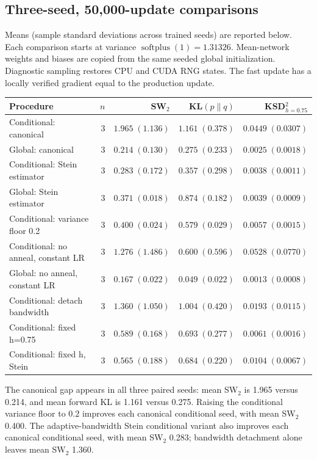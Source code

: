 \documentclass[11pt,a4paper]{article}
\numberwithin{equation}{section}
\begin{document}
\subsection{Three-seed, 50,000-update comparisons}
Means (sample standard deviations across trained seeds) are reported below.
Each comparison starts at variance $\operatorname{softplus}(1)=1.31326$.
Mean-network weights and biases are copied from the same seeded global
initialization. Diagnostic sampling restores CPU and CUDA RNG states. The
fast update has a locally verified gradient equal to the production update.
\begin{center}\small
\begin{tabular}{p{6.1cm}rrrr}\toprule
Procedure & $n$ & SW$_2$ & KL$(p\|q)$ & KSD$^2_{h=0.75}$\\\midrule
Conditional: canonical & 3 & $1.965\;(1.136)$ & $1.161\;(0.378)$ & $0.0449\;(0.0307)$ \\
Global: canonical & 3 & $0.214\;(0.130)$ & $0.275\;(0.233)$ & $0.0025\;(0.0018)$ \\
Conditional: Stein estimator & 3 & $0.283\;(0.172)$ & $0.357\;(0.298)$ & $0.0038\;(0.0011)$ \\
Global: Stein estimator & 3 & $0.371\;(0.018)$ & $0.874\;(0.182)$ & $0.0039\;(0.0009)$ \\
Conditional: variance floor 0.2 & 3 & $0.400\;(0.024)$ & $0.579\;(0.029)$ & $0.0057\;(0.0015)$ \\
Conditional: no anneal, constant LR & 3 & $1.276\;(1.486)$ & $0.600\;(0.596)$ & $0.0528\;(0.0770)$ \\
Global: no anneal, constant LR & 3 & $0.167\;(0.022)$ & $0.049\;(0.022)$ & $0.0013\;(0.0008)$ \\
Conditional: detach bandwidth & 3 & $1.360\;(1.050)$ & $1.004\;(0.420)$ & $0.0193\;(0.0115)$ \\
Conditional: fixed h=0.75 & 3 & $0.589\;(0.168)$ & $0.693\;(0.277)$ & $0.0061\;(0.0016)$ \\
Conditional: fixed h, Stein & 3 & $0.565\;(0.188)$ & $0.684\;(0.220)$ & $0.0104\;(0.0067)$ \\
\bottomrule\end{tabular}
\end{center}
The canonical gap appears in all three paired seeds: mean SW$_2$ is 1.965 versus 0.214, and mean forward KL is 1.161 versus 0.275. Raising the conditional variance floor to $0.2$ improves each canonical conditional seed, with mean SW$_2$ 0.400. The adaptive-bandwidth Stein conditional variant also improves each canonical conditional seed, with mean SW$_2$ 0.283; bandwidth detachment alone leaves mean SW$_2$ 1.360.
\end{document}
